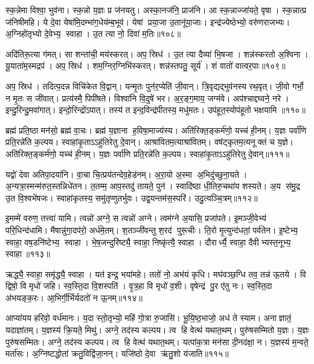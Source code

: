 स्क॒न्नेमा विश्वा॒ भुव॑ना।
स्क॒न्नो य॒ज्ञः प्र ज॑नयतु।
अस्का॒नज॑नि॒ प्राज॑नि।
आ स्क॒न्नाज्जा॑यते॒ वृषा।
स्क॒न्नात्प्र ज॑निषीमहि।
ये दे॒वा येषा॑मि॒दम्भा॑ग॒धेय॑म्ब॒भूव॑।
येषां प्रया॒जा उ॒तानू॑या॒जाः।
इन्द्र॑ज्येष्ठेभ्यो॒ वरु॑णराजभ्यः।
अ॒ग्निहो॑तृभ्यो दे॒वेभ्य॒ स्वाहा।
उ॒त त्या नो॒ दिवा॑ म॒तिः॥१०८॥

अदि॑तिरू॒त्या ग॑मत्।
सा शन्ता॑ची॒ मय॑स्करत्।
अप॒ स्रिध॑।
उ॒त त्या दैव्या॑ भि॒षजा।
शन्न॑स्करतो अ॒श्विना।
यू॒याता॑म॒स्मद्रप॑।
अप॒ स्रिध॑।
शम॒ग्निर॒ग्निभि॑स्करत्।
शन्न॑स्तपतु॒ सूर्य॑।
शं वातो॑ वात्वर॒पाः॥१०९॥

अप॒ स्रिध॑।
तदित्प॒दन्न विचि॑केत वि॒द्वान्।
यन्मृ॒तः पुन॑र॒प्येति॑ जी॒वान्।
त्रि॒वृद्यद्भुव॑नस्य रथ॒वृत्।
जी॒वो गर्भो॒ न मृ॒तः स जी॑वात्।
प्रत्य॑स्मै॒ पिपी॑षते।
विश्वा॑नि वि॒दुषे॑ भर।
अ॒र॒ङ्ग॒माय॒ जग्म॑वे।
अप॑श्चाद्दघ्वने॒ नरे।
इन्दु॒रिन्दु॒मवा॑गात्।
इन्दो॒रिन्द्रो॑ऽपात्।
तस्य॑ त इन्द॒विन्द्र॑पीतस्य॒ मधु॑मतः।
उप॑हूत॒स्योप॑हूतो भक्षयामि ॥११०॥\anuvakamend[उ॒द॒र्॒ष इ॑न्द्रि॒येण॒ गा म॒तिर॑र॒पा अ॑गा॒त्रीणि॑ च]

ब्रह्म॑ प्रति॒ष्ठा मन॑सो॒ ब्रह्म॑ वा॒चः।
ब्रह्म॑ य॒ज्ञाना ह॒विषा॒माज्य॑स्य।
अति॑रिक्त॒ङ्कर्म॑णो॒ यच्च॑ ही॒नम्।
य॒ज्ञः पर्वा॑णि प्रति॒रन्ने॑ति क॒ल्पय\sn{}।
स्वाहा॑कृ॒ताऽऽहु॑तिरेतु दे॒वान्।
आश्रा॑वितम॒त्याश्रा॑वितम्।
वष॑ट्कृतम॒त्यनूक्तं च य॒ज्ञे।
अति॑रिक्त॒ङ्कर्म॑णो॒ यच्च॑ ही॒नम्।
य॒ज्ञः पर्वा॑णि प्रति॒रन्ने॑ति क॒ल्पय\sn{}।
स्वाहा॑कृ॒ताऽऽहु॑तिरेतु दे॒वान्॥१११॥

यद्वो॑ देवा अतिपा॒दया॑नि।
वा॒चा चि॒त्प्रय॑तन्देव॒हेड॑नम्।
अ॒रा॒यो अ॒स्मा अ॒भिदु॑च्छुना॒यते।
अ॒न्यत्रा॒स्मन्म॑रुत॒स्तन्निधे॑तन।
त॒तम्म॒ आप॒स्तदु॑ तायते॒ पुन॑।
स्वादि॑ष्ठा धी॒तिरु॒चथा॑य शस्यते।
अ॒य स॑मु॒द्र उ॒त वि॒श्वभे॑षजः।
स्वाहा॑कृतस्य॒ समु॑तृप्णुतर्भुवः।
उद्व॒यन्तम॑स॒स्परि॑।
उदु॒त्यञ्चि॒त्रम्॥११२॥

इ॒मम्मे॑ वरुण॒ तत्त्वा॑ यामि।
त्वन्नो॑ अग्ने॒ स त्वन्नो॑ अग्ने।
त्वम॑ग्ने अ॒यासि॒ प्रजा॑पते।
इ॒मञ्जी॒वेभ्य॑ परि॒धिन्द॑धामि।
मैषान्नु॑गा॒दप॑रो॒ अर्ध॑मे॒तम्।
श॒तञ्जी॑वन्तु श॒रद॑ पुरू॒चीः।
ति॒रो मृ॒त्युन्द॑धतां॒ पर्व॑तेन।
इ॒ष्टेभ्य॒ स्वाहा॒ वष॒डनि॑ष्टेभ्य॒ स्वाहा।
भे॒ष॒जन्दुरि॑ष्ट्यै॒ स्वाहा॒ निष्कृ॑त्यै॒ स्वाहा।
दौरार्ध्यै॒ स्वाहा॒ दैवीभ्यस्त॒नूभ्य॒ स्वाहा॥११३॥

ऋद्ध्यै॒ स्वाहा॒ समृ॑द्ध्यै॒ स्वाहा।
यत॑ इन्द्र॒ भया॑महे।
ततो॑ नो॒ अभ॑यं कृधि।
मघ॑वञ्छ॒ग्धि तव॒ तन्न॑ ऊ॒तये।
वि द्विषो॒ वि मृधो॑ जहि।
स्व॒स्ति॒दा वि॒शस्पति॑।
वृ॒त्र॒हा वि मृधो॑ व॒शी।
वृषेन्द्र॑ पु॒र ए॑तु नः।
स्व॒स्ति॒दा अ॑भयङ्क॒रः।
आ॒भिर्गी॒र्भिर्यदतो॑ न ऊ॒नम्॥११४॥

आप्या॑यय हरिवो॒ वर्ध॑मानः।
य॒दा स्तो॒तृभ्यो॒ महि॑ गो॒त्रा रु॒जासि॑।
भू॒यि॒ष्ठ॒भाजो॒ अध॑ ते स्याम।
अनाज्ञातं॒ यदाज्ञा॑तम्।
य॒ज्ञस्य॑ क्रि॒यते॒ मिथु॑।
अग्ने॒ तद॑स्य कल्पय।
त्व हि वेत्थ॑ यथात॒थम्।
पुरु॑षसम्मितो य॒ज्ञः।
य॒ज्ञः पुरु॑षसम्मितः।
अग्ने॒ तद॑स्य कल्पय।
त्व हि वेत्थ॑ यथात॒थम्।
यत्पा॑क॒त्रा मन॑सा दी॒नद॑क्षा॒ न।
य॒ज्ञस्य॑ म॒न्वते॒ मर्ता॑सः।
अ॒ग्निष्टद्धोता॑ क्रतु॒विद्वि॑जा॒नन्।
यजि॑ष्ठो दे॒वा ऋ॑तु॒शो य॑जाति॥११५॥\anuvakamend[दे॒वा श्चि॒त्रं त॒नूभ्य॒ स्वाहो॒नं पुरु॑षसम्मि॒तोऽग्ने॒ तद॑स्य कल्पय॒ पञ्च॑ च]

